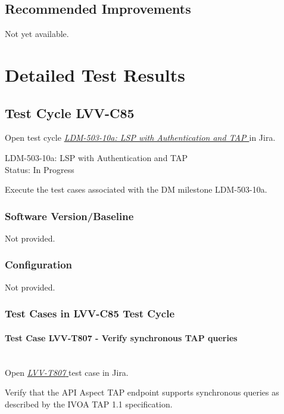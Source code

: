 \documentclass[DM,lsstdraft,STR,toc]{lsstdoc}
\begin{document}
\subsection{Recommended Improvements}
\label{sect:recommendations}

Not yet available.

\newpage
\section{Detailed Test Results}
\label{sect:detailedtestresults}


  \subsection{Test Cycle LVV-C85 }

Open test cycle {\it \href{https://jira.lsstcorp.org/secure/Tests.jspa#/testrun/LVV-C85}{LDM-503-10a: LSP with Authentication and TAP
}} in Jira.

  LDM-503-10a: LSP with Authentication and TAP
\\
  Status: In Progress

  Execute the test cases associated with the DM milestone LDM-503-10a.


  \subsubsection{Software Version/Baseline}
    Not provided.

  \subsubsection{Configuration}
    Not provided.

  \subsubsection{Test Cases in LVV-C85 Test Cycle}


    \paragraph{Test Case LVV-T807 - Verify synchronous TAP queries
 }\mbox{}\\

Open  \href{https://jira.lsstcorp.org/secure/Tests.jspa#/testCase/LVV-T807}{\textit{ LVV-T807 } }
test case in Jira.

    Verify that the API Aspect TAP endpoint supports synchronous queries as
described by the IVOA TAP 1.1 specification. ~ ~
\end{document}
